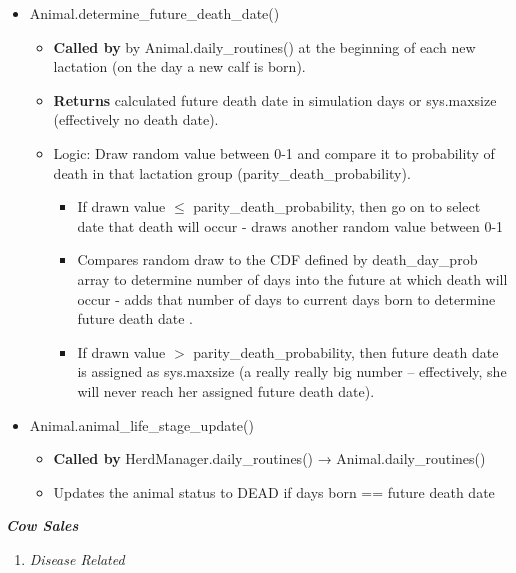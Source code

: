 \documentclass{article}
\begin{document}
\begin{refsection}
        \begin{itemize}
            \item Animal.determine\_future\_death\_date()
            \begin{itemize}
                \item \textbf{Called by} by Animal.daily\_routines() at the beginning of each new lactation (on the day a new calf is born).
                \item \textbf{Returns} calculated future death date in simulation days or sys.maxsize (effectively no death date).
                \item Logic: Draw random value between 0-1 and compare it to probability of death in that lactation group (parity\_death\_probability).
                \begin{itemize}
                    \item If drawn value \(\leq \) parity\_death\_probability, then go on to select date that death will occur - draws another random value between 0-1
                    \item Compares random draw to the CDF defined by death\_day\_prob array to determine number of days into the future at which death will occur - adds that number of days to current days born to determine future death date .
                    \item If drawn value \( > \) parity\_death\_probability, then future death date is assigned as sys.maxsize (a really really big number – effectively, she will never reach her assigned future death date).
                \end{itemize}

            \end{itemize}
            \item Animal.animal\_life\_stage\_update() 
            \begin{itemize}
                \item \textbf{Called by}  HerdManager.daily\_routines() → Animal.daily\_routines()
                \item Updates the animal status to DEAD if days born == future death date
            \end{itemize}
        \end{itemize}
        \vspace{0.2cm}


\textbf{\textit{Cow Sales}}

    \begin{enumerate}
        \item \textit{Disease Related}
        \vspace{0.1cm}
        

\end{enumerate}
\end{refsection}
\end{document}

